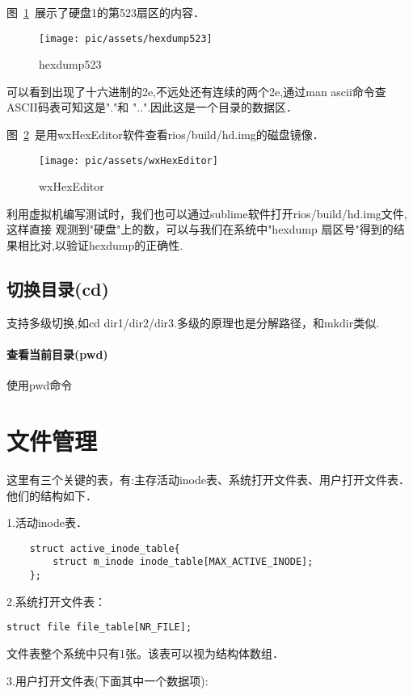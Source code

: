 图~\ref{hexdump523}~展示了硬盘1的第523扇区的内容．
\begin{figure}[!htbp]
    \centering	\texttt{[image: pic/assets/hexdump523]}
	\caption{hexdump523}	\label{hexdump523}	\end{figure}
	
可以看到出现了十六进制的2e,不远处还有连续的两个2e,通过man ascii命令查ASCII码表可知这是"."和
"..".因此这是一个目录的数据区．

图~\ref{wxHexEditor}~是用wxHexEditor软件查看rios/build/hd.img的磁盘镜像．
\begin{figure}[!htbp]
    \centering	\texttt{[image: pic/assets/wxHexEditor]}
	\caption{wxHexEditor}	\label{wxHexEditor}	\end{figure}
	
利用虚拟机编写测试时，我们也可以通过sublime软件打开rios/build/hd.img文件,这样直接
观测到"硬盘"上的数，可以与我们在系统中"hexdump 扇区号"得到的结果相比对,以验证hexdump的正确性. 
	
\subsection{切换目录(cd)}
支持多级切换,如cd dir1/dir2/dir3.多级的原理也是分解路径，和mkdir类似.

\paragraph{查看当前目录(pwd)}

使用pwd命令


\section{文件管理}
这里有三个关键的表，有:主存活动inode表、系统打开文件表、用户打开文件表．
他们的结构如下．

1.活动inode表．
\begin{verbatim}
	struct active_inode_table{
		struct m_inode inode_table[MAX_ACTIVE_INODE];
	};   
\end{verbatim}

2.系统打开文件表：

\begin{verbatim}
struct file file_table[NR_FILE];	   
\end{verbatim}

文件表整个系统中只有1张。该表可以视为结构体数组．

3.用户打开文件表(下面其中一个数据项):

